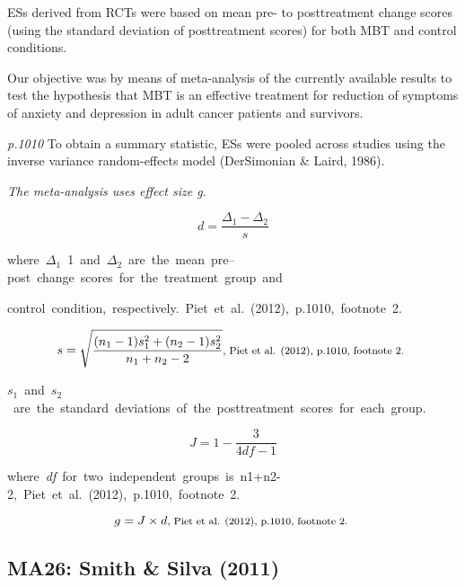 \documentclass{article}
\begin{document}
ESs derived from RCTs were based on mean pre- to posttreatment change scores (using the standard deviation of posttreatment scores) for both MBT and control conditions.

Our objective was by means of meta-analysis of the currently available results to test the hypothesis that MBT is an effective treatment for reduction of symptoms of anxiety and depression in adult cancer patients and survivors.

\textit{p.1010} To obtain a summary statistic, ESs were pooled across studies using the inverse variance random-effects model (DerSimonian \& Laird, 1986).

\vspace{3mm}
\textit{The meta-analysis uses effect size g.}

\begin{equation*}
d={\frac {\Delta_{1}-\Delta_{2}}{s}}  
\end{equation*}

\mbox{\footnotesize where $\Delta_{1}$ 1 and $\Delta_{2}$ are the mean pre–post change scores for the treatment group and }

\mbox{\footnotesize control condition, respectively. Piet et al. (2012), p.1010, footnote 2. } 

\begin{equation*}
s={\sqrt {\frac {(n_{1}-1)s_{1}^{2}+(n_{2}-1)s_{2}^{2}}{n_{1}+n_{2}-2}}} \mbox{\footnotesize, Piet et al. (2012), p.1010, footnote 2. } 
\end{equation*}

\mbox{\footnotesize $s_{1}$ and $s_{2}$ are the standard deviations of the posttreatment scores for each group. } 

\begin{equation*}
J={1-{\frac {3}{4df-1}}} 
\end{equation*} 

\mbox {\footnotesize where \textit{df} for two independent groups is n1+n2-2,  Piet et al. (2012), p.1010, footnote 2. }

\begin{equation*}
g=J \times d \mbox{\footnotesize,  Piet et al. (2012), p.1010, footnote 2. } 
\end{equation*}


\subsection*{MA26: Smith \& Silva (2011)}
\end{document}
